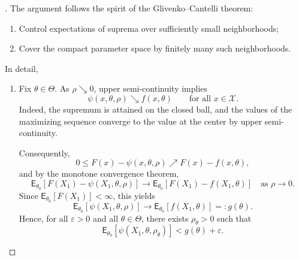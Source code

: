 \begin{proof}[]
The argument follows the spirit of the Glivenko--Cantelli theorem:
\begin{enumerate}[label=\roman*)]
	\item Control expectations of suprema over sufficiently small neighborhoods;
	\item Cover the compact parameter space by finitely many such neighborhoods.
\end{enumerate}

In detail,
\begin{enumerate}[label=\roman*.]
\item
Fix $\theta\in\Theta$. As $\rho\searrow 0$, upper semi-continuity implies
\begin{equation*}
\psi(x,\theta,\rho) \searrow f(x,\theta)
\qquad \text{for all } x\in\mathcal{X}.
\end{equation*}
Indeed, the supremum is attained on the closed ball, and the values of the maximizing sequence converge to the value at the center by upper semi-continuity.

Consequently,
\begin{equation*}
0 \le F(x)-\psi(x,\theta,\rho) \nearrow F(x)-f(x,\theta),
\end{equation*}
and by the monotone convergence theorem,
\begin{equation*}
\mathsf{E}_{\theta_0}[F(X_1)-\psi(X_1,\theta,\rho)]
\longrightarrow
\mathsf{E}_{\theta_0}[F(X_1)-f(X_1,\theta)]
\quad \text{as } \rho\to 0.
\end{equation*}
Since $\mathsf{E}_{\theta_0}[F(X_1)]<\infty$, this yields
\begin{equation*}
\mathsf{E}_{\theta_0}[\psi(X_1,\theta,\rho)]
\longrightarrow
\mathsf{E}_{\theta_0}[f(X_1,\theta)]
=: g(\theta).
\end{equation*}
Hence, for all $\varepsilon>0$ and all $\theta\in\Theta$, there exists $\rho_\theta>0$ such that
\begin{equation*}
\mathsf{E}_{\theta_0}[\psi(X_1,\theta,\rho_\theta)]
<
g(\theta)+\varepsilon.
\end{equation*}


\end{enumerate}
\end{proof}
